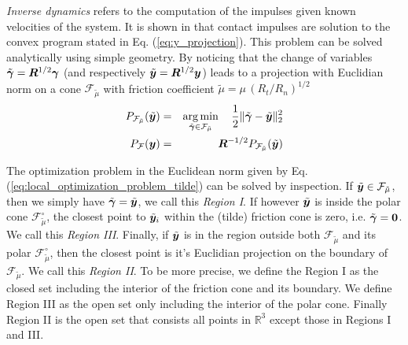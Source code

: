 \textit{Inverse dynamics} refers to the computation of the impulses given known
velocities of the system. It is shown in \cite{bib:todorov2014} that contact
impulses are solution to the convex program stated in Eq.
(\ref{eq:y_projection}). This problem can be solved analytically using simple
geometry. By noticing that the change of variables
$\tilde{{\bm\gamma}}={\bm{R}}^{1/2}{\bm\gamma}$ (and respectively
$\tilde{{\bm{y}}}={\bm{R}}^{1/2}{\bm{y}}$) leads to a projection with Euclidian norm
on a cone $\mathcal{F}_{\tilde\mu}$ with friction coefficient
$\tilde\mu=\mu\,(R_t/R_n)^{1/2}$
\begin{eqnarray}
	P_\mathcal{F_{\tilde\mu}}(\tilde{\vf{y}})&=&\argmin_{\tilde\bgamma\in\mathcal{F_{\tilde\mu}}}
		\quad \frac{1}{2}\Vert\tilde\bgamma-\tilde{\vf{y}}\Vert_2^2\nonumber\\
	P_\mathcal{F}(\vf{y}) &=&
	\vf{R}^{-1/2}P_\mathcal{F_{\tilde\mu}}(\tilde{\vf{y}})
	\label{eq:local_optimization_problem_tilde}
\end{eqnarray}

The optimization problem in the Euclidean norm given by Eq.
(\ref{eq:local_optimization_problem_tilde}) can be solved by inspection. If
$\tilde{{\bm{y}}}\in\mathcal{F}_{\tilde\mu}$, then we simply have $\tilde{{\bm\gamma}}
= \tilde{{\bm{y}}}$, we call this \textit{Region I}. If however $\tilde{{\bm{y}}}$
is inside the polar cone $\mathcal{F}_{\tilde\mu}^\circ$, the closest point to
$\tilde{{\bm{y}}}_i$ within the (tilde) friction cone is zero, i.e.
$\tilde{{\bm\gamma}} ={\bm{0}}$. We call this \textit{Region III}. Finally, if
$\tilde{{\bm{y}}}$ is in the region outside both $\mathcal{F}_{\tilde\mu}$ and its
polar $\mathcal{F}_{\tilde\mu}^\circ$, then the closest point is it's Euclidian
projection on the boundary of $\mathcal{F}_{\tilde\mu}$. We call this
\textit{Region II}. To be more precise, we define the Region I as the closed set
including the interior of the friction cone and its boundary. We define Region
III as the open set only including the interior of the polar cone. Finally
Region II is the open set that consists all points in $\mathbb{R}^3$ except
those in Regions I and III.

